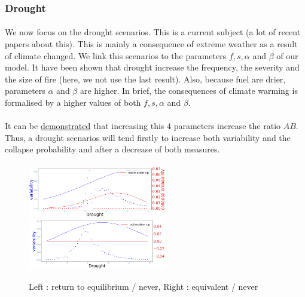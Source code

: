 \documentclass{article}
\begin{document}
\newpage
\subsubsection{Drought}


\paragraph{}
We now focus on the drought scenarios. This is a current subject (a lot of recent papers about this). This is mainly a consequence of extreme weather as a result of climate changed. We link this scenarios to the parameters $f, s, \alpha$ and $\beta$ of our model. It have been shown that drought increase the frequency, the severity and the size of fire (here, we not use the last result). Also, because fuel are drier, parameters $\alpha$ and $\beta$ are higher. In brief, the consequences of climate warming is formalised by a higher values of both $f, s, \alpha$ and $\beta$.



\paragraph{}
It can be \hyperref[drought_increase]{demonstrated} that increasing this $4$ parameters increase the ratio $AB$. Thus, a drought scenarios will tend firstly to increase both variability and the collapse probability and after a decrease of both measures.

\paragraph{}



\begin{figure}[h]
\begin{center}
\includegraphics[width=6cm]{results/drought/return_never.png}
\includegraphics[width=6cm]{results/drought/equivalent_never.png}
\end{center}
\caption{\label{fig:temp}Left : return to equilibrium / never, Right : equivalent / never}
\end{figure}
\end{document}
